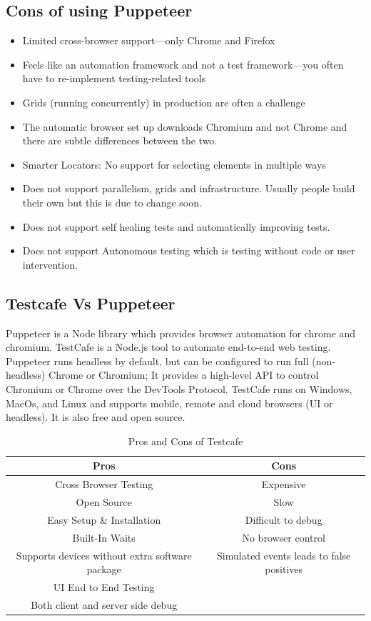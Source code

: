 \documentclass[12pt,a4paper,titlepage]{report}
\begin{document}
\subsection{Cons of using Puppeteer}
\begin{itemize}
 \item Limited cross-browser support—only Chrome and Firefox
 \item Feels like an automation framework and not a test framework—you often have to re-implement testing-related tools
 \item Grids (running concurrently) in production are often a challenge
 \item The automatic browser set up downloads Chromium and not Chrome and there are subtle differences between the two.
 \item Smarter Locators: No support for selecting elements in multiple ways
 \item Does not support parallelism, grids and infrastructure. Usually people build their own but this is due to change soon.
 \item Does not support self healing tests and automatically improving tests.
 \item Does not support Autonomous testing which is testing without code or user intervention.
\end{itemize}

\subsection{Testcafe Vs Puppeteer}

Puppeteer is a Node library which provides browser automation for chrome and chromium.
TestCafe is a Node.js tool to automate end-to-end web testing. Puppeteer runs headless by default,
but can be configured to run full (non-headless) Chrome or Chromium; It provides a high-level API to
control Chromium or Chrome over the DevTools Protocol. TestCafe runs on Windows, MacOs, and Linux and
supports mobile, remote and cloud browsers (UI or headless). It is also free and open source.

\begin{table}[ht]
  \centering
  \small
  \setlength\tabcolsep{6pt}
  \begin{tabular}{|c|c|}
   \hline \textbf
   {Pros} & \textbf {Cons}\\
   \hline\hline
   Cross Browser Testing&Expensive\\
   \hline
   Open Source& Slow\\
   \hline
   Easy Setup \& Installation& Difficult to debug\\
   \hline
   Built-In Waits& No browser control\\
   \hline
   Supports devices without extra software package & Simulated events leads to false positives\\
   \hline
   UI End to End Testing\\
   \hline
   Both client and server side debug \\
   \hline
  \end{tabular}
  \caption{Pros and Cons of Testcafe}
 \end{table}
\end{document}
